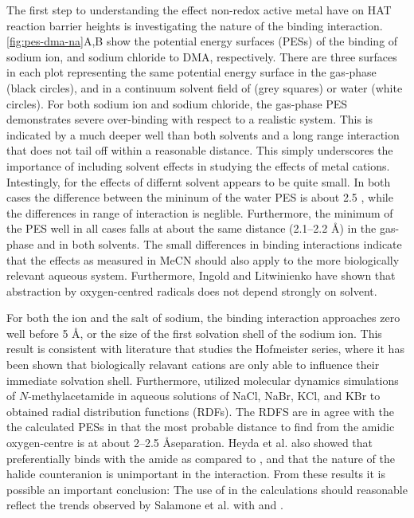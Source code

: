 The first step to understanding the effect non-redox active metal have on HAT reaction barrier heights is investigating the nature of the binding interaction. \ref{fig:pes-dma-na}A,B show the potential energy surfaces (PESs) of the binding of sodium ion, and sodium chloride to DMA, respectively. There are three surfaces in each plot representing the same potential energy surface in the gas-phase (black circles), and in a continuum solvent field of (grey squares) or water (white circles). For both sodium ion and sodium chloride, the gas-phase PES demonstrates severe over-binding with respect to a realistic system. This is indicated by a much deeper well than both solvents and a long range interaction that does not tail off within a reasonable distance. This simply underscores the importance of including solvent effects in studying the effects of metal cations. Intestingly, for the effects of differnt solvent appears to be quite small. In both cases the difference between the mininum of the water PES is about 2.5 \kcalmol, while the differences in range of interaction is neglible. Furthermore, the minimum of the PES well in all cases falls at about the same distance (2.1--2.2 \AA) in the gas-phase and in both solvents. The small differences in binding interactions indicate that the effects as measured in MeCN should also apply to the more biologically relevant aqueous system. Furthermore, Ingold and Litwinienko have shown that  abstraction by oxygen-centred radicals does not depend strongly on solvent.\cite{Litwinienko2007}

For both the ion and the salt of sodium, the binding interaction approaches zero well before 5 \AA, or the size of the first solvation shell of the sodium ion.\cite{Degreve1996} This result is consistent with literature that studies the Hofmeister series, where it has been shown that biologically relavant cations are only able to influence their immediate solvation shell.\cite{Omta2003, Funker2011} Furthermore, \citet{Heyda2009} utilized molecular dynamics simulations of $N$-methylacetamide in aqueous solutions of NaCl, NaBr, KCl, and KBr to obtained radial distribution functions (RDFs). The RDFS are in agree with the the calculated PESs in that the most probable distance to find  from the amidic oxygen-centre is at about 2--2.5 \AA separation. Heyda et al. also showed that  preferentially binds with the amide as compared to , and that the nature of the halide counteranion is unimportant in the interaction. From these results it is possible an important conclusion: The use of  in the calculations should reasonable reflect the trends observed by Salamone et al. with  and .

